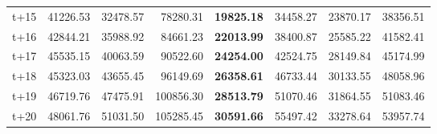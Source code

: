 \begin{table}[H]
\begin{tabular}{lrrrrrrr}
t+15  & 41226.53  & 32478.57  & 78280.31  & \textbf{19825.18}  & 34458.27  & 23870.17  & 38356.51  \\
t+16  & 42844.21  & 35988.92  & 84661.23  & \textbf{22013.99}  & 38400.87  & 25585.22  & 41582.41  \\
t+17  & 45535.15  & 40063.59  & 90522.60  & \textbf{24254.00}  & 42524.75  & 28149.84  & 45174.99  \\
t+18  & 45323.03  & 43655.45  & 96149.69  & \textbf{26358.61}  & 46733.44  & 30133.55  & 48058.96  \\
t+19  & 46719.76  & 47475.91  & 100856.30  & \textbf{28513.79}  & 51070.46  & 31864.55  & 51083.46  \\
t+20  & 48061.76  & 51031.50  & 105285.45  & \textbf{30591.66}  & 55497.42  & 33278.64  & 53957.74  \\

\bottomrule
\end{tabular}
\end{table}
